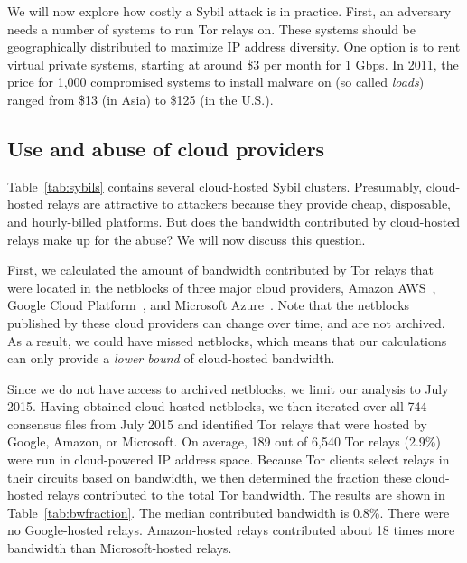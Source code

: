 We will now explore how costly a Sybil attack is in practice.  First, an
adversary needs a number of systems to run Tor relays on.  These systems should
be geographically distributed to maximize IP address diversity.  One option is
to rent virtual private systems, starting at around \$3 per month for 1 Gbps.
In 2011, the price for 1,000 compromised systems to install malware on (so
called \emph{loads}) ranged from \$13 (in Asia) to \$125 (in the U.S.)\cite[\S
5]{Stone-Gross2011a}.


\subsection{Use and abuse of cloud providers}
Table~\ref{tab:sybils} contains several cloud-hosted Sybil clusters.
Presumably, cloud-hosted relays are attractive to attackers because they
provide cheap, disposable, and hourly-billed platforms.  But does the bandwidth
contributed by cloud-hosted relays make up for the abuse?  We will now discuss
this question.

First, we calculated the amount of bandwidth contributed by Tor relays that
were located in the netblocks of three major cloud providers, Amazon
AWS~\cite{amazonaws}, Google Cloud Platform~\cite{googlecloud}, and Microsoft
Azure~\cite{azure}.  Note that the netblocks published by these cloud providers
can change over time, and are not archived.  As a result, we could have missed
netblocks, which means that our calculations can only provide a \emph{lower
bound} of cloud-hosted bandwidth.

Since we do not have access to archived netblocks, we limit our analysis to
July 2015.  Having obtained cloud-hosted netblocks, we then iterated over all
744 consensus files from July 2015 and identified Tor relays that were hosted
by Google, Amazon, or Microsoft.  On average, 189 out of 6,540 Tor relays
(2.9\%) were run in cloud-powered IP address space.  Because Tor
clients select relays in their circuits based on bandwidth, we then determined
the fraction these cloud-hosted relays contributed to the total Tor bandwidth.
The results are shown in Table~\ref{tab:bwfraction}.  The median contributed
bandwidth is 0.8\%.  There were no Google-hosted relays.  Amazon-hosted relays
contributed about 18 times more bandwidth than Microsoft-hosted relays.


